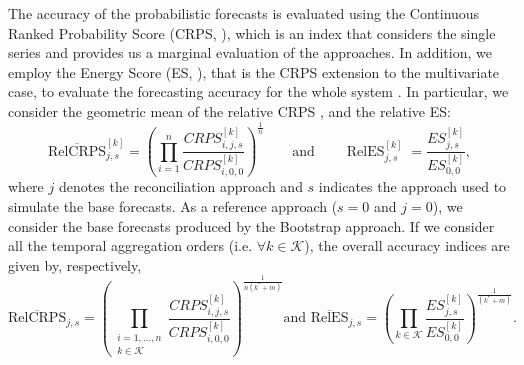 \documentclass[a4paper,11pt]{article}
\newcommand{\xvet}{\bm{x}}
\newcommand{\zvet}{\bm{z}}
\theoremstyle{definition}
\begin{document}
The accuracy of the probabilistic forecasts is evaluated using the Continuous Ranked Probability Score (CRPS, \citealp{matheson1976ms, gneiting2014}), %
which is an index that considers the single series and provides us a marginal evaluation of the approaches. In addition, we employ the Energy Score (ES, \citealp{gneiting2014}), that is the CRPS extension to the multivariate case, to evaluate the forecasting accuracy for the whole system \citep{panagiotelis2023, wickramasuriya2021b}.
In particular, we consider the geometric mean of the relative CRPS \citep{fleming1986}, and the relative ES:
\begin{equation}\label{eq:skill}
	\operatorname{\overline{RelCRPS}}_{j,s}^{[k]} = \left(\prod_{i = 1}^n \frac{CRPS^{[k]}_{i, j, s}}{CRPS^{[k]}_{i, 0, 0}}\right)^{\frac{1}{n}} \qquad \mathrm{and} \qquad \operatorname{RelES}_{j,s}^{[k]} = \frac{ES^{[k]}_{j, s}}{ES^{[k]}_{0, 0}},
\end{equation}
where $j$ denotes the reconciliation approach and $s$ indicates the approach used to simulate the base forecasts. As a reference approach ($s=0$ and $j=0$), we consider the base forecasts produced by the Bootstrap approach. If we consider all the temporal aggregation orders (i.e. $\forall k \in \mathcal{K}$), the overall accuracy indices are given by, respectively,
\begin{equation}\label{eq:skill_all}
	\operatorname{\overline{RelCRPS}}_{j,s} = \left(\prod_{\substack{i = 1, \dots, n \\ k \in \mathcal{K}}}\frac{CRPS^{[k]}_{i, j, s}}{CRPS^{[k]}_{i, 0, 0}}\right)^{\frac{1}{n(k^\ast+m)}}\mbox{and } \operatorname{\overline{RelES}}_{j,s}= \left(\prod_{k \in \mathcal{K}}\frac{ES^{[k]}_{j, s}}{ES^{[k]}_{0, 0}}\right)^{\frac{1}{(k^\ast+m)}}.
\end{equation}
\end{document}
